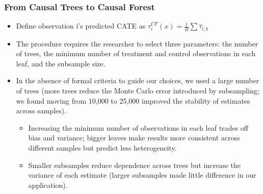 \documentclass[
  shownotes,
  xcolor={svgnames},
  hyperref={colorlinks,citecolor=DarkBlue,linkcolor=DarkRed,urlcolor=DarkBlue}
  , aspectratio=169]{beamer}
\begin{document}
\begin{frame}[fragile]
\frametitle{From Causal Trees to Causal Forest}

\begin{itemize}

  \item Define observation i’s predicted CATE as $\hat{\tau}^{CF}_i (x)=\frac{1}{B} \sum \hat{\tau}_{l,b} $
  \medskip
  \pause
  \item The procedure requires the researcher to select three parameters: the number of trees, the minimum number of treatment and control observations in each leaf, and the subsample size. 
  \medskip
  \item In the absence of formal criteria to guide our choices, we used a large number of trees (more trees reduce the Monte Carlo error introduced by subsampling; we found moving from 10,000 to 25,000 improved the stability of estimates across samples). 
  \medskip
  \begin{itemize}
    \item Increasing the minimum number of observations in each leaf trades off bias and variance; bigger leaves make results more consistent across different samples but predict less heterogeneity. 
    \item Smaller subsamples reduce dependence across trees but increase the variance of each estimate (larger subsamples made little difference in our application).
  \end{itemize}
\end{itemize}

\end{frame}
\end{document}
